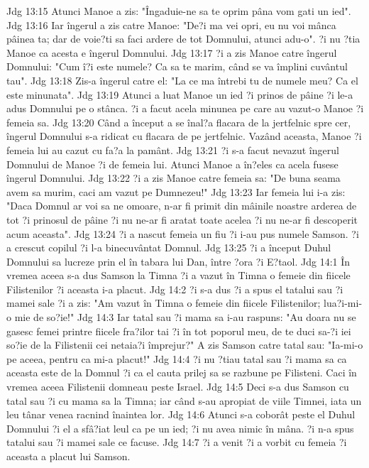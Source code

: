 Jdg 13:15  Atunci Manoe a zis: "Îngaduie-ne sa te oprim pâna vom gati un ied".
Jdg 13:16  Iar îngerul a zis catre Manoe: "De?i ma vei opri, eu nu voi mânca pâinea ta; dar de voie?ti sa faci ardere de tot Domnului, atunci adu-o". ?i nu ?tia Manoe ca acesta e îngerul Domnului.
Jdg 13:17  ?i a zis Manoe catre îngerul Domnului: "Cum î?i este numele? Ca sa te marim, când se va împlini cuvântul tau".
Jdg 13:18  Zis-a îngerul catre el: "La ce ma întrebi tu de numele meu? Ca el este minunata".
Jdg 13:19  Atunci a luat Manoe un ied ?i prinos de pâine ?i le-a adus Domnului pe o stânca. ?i a facut acela minunea pe care au vazut-o Manoe ?i femeia sa.
Jdg 13:20  Când a început a se înal?a flacara de la jertfelnic spre cer, îngerul Domnului s-a ridicat cu flacara de pe jertfelnic. Vazând aceasta, Manoe ?i femeia lui au cazut cu fa?a la pamânt.
Jdg 13:21  ?i s-a facut nevazut îngerul Domnului de Manoe ?i de femeia lui. Atunci Manoe a în?eles ca acela fusese îngerul Domnului.
Jdg 13:22  ?i a zis Manoe catre femeia sa: "De buna seama avem sa murim, caci am vazut pe Dumnezeu!"
Jdg 13:23  Iar femeia lui i-a zis: "Daca Domnul ar voi sa ne omoare, n-ar fi primit din mâinile noastre arderea de tot ?i prinosul de pâine ?i nu ne-ar fi aratat toate acelea ?i nu ne-ar fi descoperit acum aceasta".
Jdg 13:24  ?i a nascut femeia un fiu ?i i-au pus numele Samson. ?i a crescut copilul ?i l-a binecuvântat Domnul.
Jdg 13:25  ?i a început Duhul Domnului sa lucreze prin el în tabara lui Dan, între ?ora ?i E?taol.
Jdg 14:1  În vremea aceea s-a dus Samson la Timna ?i a vazut în Timna o femeie din fiicele Filistenilor ?i aceasta i-a placut.
Jdg 14:2  ?i s-a dus ?i a spus el tatalui sau ?i mamei sale ?i a zis: "Am vazut în Timna o femeie din fiicele Filistenilor; lua?i-mi-o mie de so?ie!"
Jdg 14:3  Iar tatal sau ?i mama sa i-au raspuns: "Au doara nu se gasesc femei printre fiicele fra?ilor tai ?i în tot poporul meu, de te duci sa-?i iei so?ie de la Filistenii cei netaia?i împrejur?" A zis Samson catre tatal sau: "Ia-mi-o pe aceea, pentru ca mi-a placut!"
Jdg 14:4  ?i nu ?tiau tatal sau ?i mama sa ca aceasta este de la Domnul ?i ca el cauta prilej sa se razbune pe Filisteni. Caci în vremea aceea Filistenii domneau peste Israel.
Jdg 14:5  Deci s-a dus Samson cu tatal sau ?i cu mama sa la Timna; iar când s-au apropiat de viile Timnei, iata un leu tânar venea racnind înaintea lor.
Jdg 14:6  Atunci s-a coborât peste el Duhul Domnului ?i el a sfâ?iat leul ca pe un ied; ?i nu avea nimic în mâna. ?i n-a spus tatalui sau ?i mamei sale ce facuse.
Jdg 14:7  ?i a venit ?i a vorbit cu femeia ?i aceasta a placut lui Samson.
